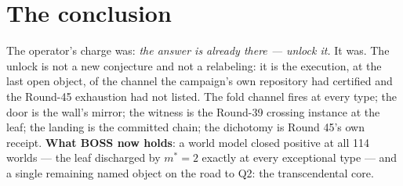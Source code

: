\documentclass[11pt]{article}
\begin{document}
\section{The conclusion}

The operator's charge was: \emph{the answer is already there --- unlock it.}  It was.  The
unlock is not a new conjecture and not a relabeling: it is the execution, at the last open
object, of the channel the campaign's own repository had certified and the Round-45 exhaustion
had not listed.  The fold channel fires at every type; the door is the wall's mirror; the
witness is the Round-39 crossing instance at the leaf; the landing is the committed chain; the
dichotomy is Round 45's own receipt.  \textbf{What BOSS now holds}: a world model closed
positive at all 114 worlds --- the leaf discharged by $m^* = 2$ exactly at every exceptional
type --- and a single remaining named object on the road to Q2: the transcendental core.
\end{document}
